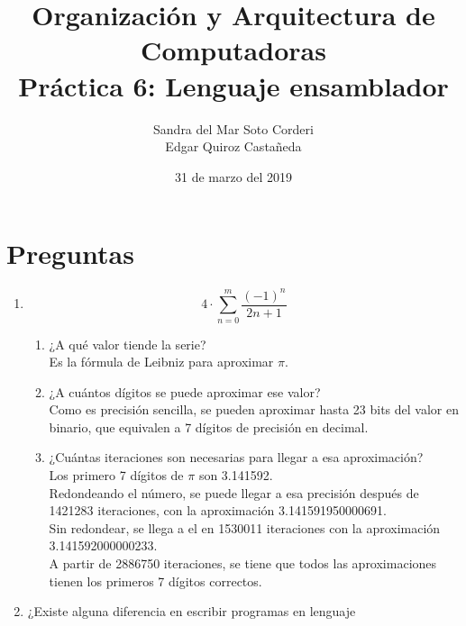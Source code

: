 \documentclass{article}
\begin{document}
    \title{
        Organización y Arquitectura de Computadoras \\
        Práctica 6: Lenguaje ensamblador \\
    }
    \date{
        31 de marzo del 2019
    }
    \author{
        Sandra del Mar Soto Corderi \\
        Edgar Quiroz Castañeda
    }
    \maketitle

    \section{Preguntas}
    \begin{enumerate}
        \item {
            \[4\cdot\sum_{n=0}^{m}{\frac{(-1)^{n}}{2n+1}}\]
            \begin{enumerate}
                \item ¿A qué valor tiende la serie?\\
                Es la fórmula de Leibniz\cite{wolfram pi} para aproximar $\pi$.
                \item ¿A cuántos dígitos se puede aproximar ese valor?\\
                Como es precisión sencilla, se pueden aproximar hasta 23 bits
                del valor en binario, que equivalen a 7 dígitos de precisión en
                decimal\cite{ieee flot32 std}.
                \item ¿Cuántas iteraciones son necesarias para llegar a esa
                aproximación? \\
                Los primero 7 dígitos de $\pi$ son 3.141592\cite{pi dig}.\\
                Redondeando el número, se puede llegar a esa precisión después
                de 1421283 iteraciones,  con la aproximación 3.141591950000691. \\
                Sin redondear, se llega a el en 1530011 iteraciones con la
                aproximación 3.141592000000233.\\
                A partir de 2886750 iteraciones, se tiene que todos las
                aproximaciones tienen los primeros 7 dígitos correctos.\\
            \end{enumerate}
        }
        \item ¿Existe alguna diferencia en escribir programas en lenguaje 

\end{enumerate}
\end{document}
